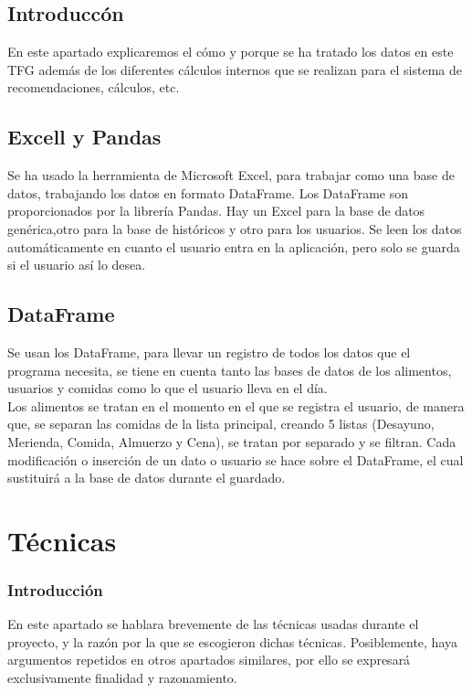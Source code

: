 \subsection{Introduccón}
En este apartado explicaremos el cómo y porque se ha tratado los datos en este TFG además de los diferentes cálculos internos que se realizan para el sistema de recomendaciones, cálculos, etc.
\subsection{Excell y Pandas}
Se ha usado la herramienta de Microsoft Excel, para trabajar como una base de datos, trabajando los datos en formato DataFrame. Los DataFrame son proporcionados por la librería Pandas. Hay un Excel para la base de datos genérica,otro para la base de históricos y otro para los usuarios. Se leen los datos automáticamente en cuanto el usuario entra en la aplicación, pero solo se guarda si el usuario así lo desea.
\subsection{DataFrame}
Se usan los DataFrame, para llevar un registro de todos los datos que el programa necesita, se tiene en cuenta tanto las bases de datos de los alimentos, usuarios y comidas como lo que el usuario lleva en el día.
\\
Los alimentos se tratan en el momento en el que se registra el usuario, de manera que, se separan las comidas de la lista principal, creando 5 listas (Desayuno, Merienda, Comida, Almuerzo y Cena), se tratan por separado y se filtran. Cada modificación o inserción de un dato o usuario se hace sobre el DataFrame, el cual sustituirá a la base de datos durante el guardado.

\section{Técnicas}
\subsubsection{Introducción}
En este apartado se hablara brevemente de las técnicas usadas durante el proyecto, y la razón por la que se escogieron dichas técnicas. Posiblemente, haya argumentos repetidos en otros apartados similares, por ello se expresará exclusivamente finalidad y razonamiento.
